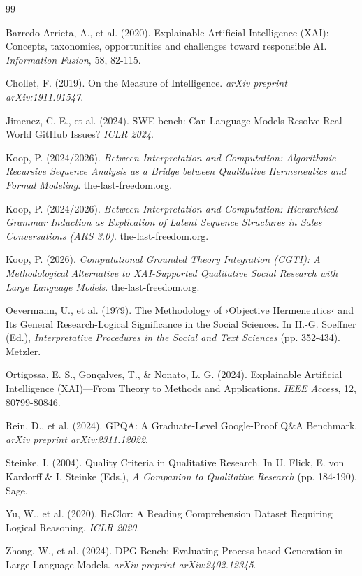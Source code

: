\documentclass[12pt,a4paper]{article}
\begin{document}
\begin{thebibliography}{99}

Barredo Arrieta, A., et al. (2020). Explainable Artificial Intelligence (XAI): Concepts, taxonomies, opportunities and challenges toward responsible AI. \textit{Information Fusion}, 58, 82-115.

Chollet, F. (2019). On the Measure of Intelligence. \textit{arXiv preprint arXiv:1911.01547}.

Jimenez, C. E., et al. (2024). SWE-bench: Can Language Models Resolve Real-World GitHub Issues? \textit{ICLR 2024}.

Koop, P. (2024/2026). \textit{Between Interpretation and Computation: Algorithmic Recursive Sequence Analysis as a Bridge between Qualitative Hermeneutics and Formal Modeling}. the-last-freedom.org.

Koop, P. (2024/2026). \textit{Between Interpretation and Computation: Hierarchical Grammar Induction as Explication of Latent Sequence Structures in Sales Conversations (ARS 3.0)}. the-last-freedom.org.

Koop, P. (2026). \textit{Computational Grounded Theory Integration (CGTI): A Methodological Alternative to XAI-Supported Qualitative Social Research with Large Language Models}. the-last-freedom.org.

Oevermann, U., et al. (1979). The Methodology of ›Objective Hermeneutics‹ and Its General Research-Logical Significance in the Social Sciences. In H.-G. Soeffner (Ed.), \textit{Interpretative Procedures in the Social and Text Sciences} (pp. 352-434). Metzler.

Ortigossa, E. S., Gonçalves, T., \& Nonato, L. G. (2024). Explainable Artificial Intelligence (XAI)—From Theory to Methods and Applications. \textit{IEEE Access}, 12, 80799-80846.

Rein, D., et al. (2024). GPQA: A Graduate-Level Google-Proof Q\&A Benchmark. \textit{arXiv preprint arXiv:2311.12022}.

Steinke, I. (2004). Quality Criteria in Qualitative Research. In U. Flick, E. von Kardorff \& I. Steinke (Eds.), \textit{A Companion to Qualitative Research} (pp. 184-190). Sage.

Yu, W., et al. (2020). ReClor: A Reading Comprehension Dataset Requiring Logical Reasoning. \textit{ICLR 2020}.

Zhong, W., et al. (2024). DPG-Bench: Evaluating Process-based Generation in Large Language Models. \textit{arXiv preprint arXiv:2402.12345}.

\end{thebibliography}
\end{document}
